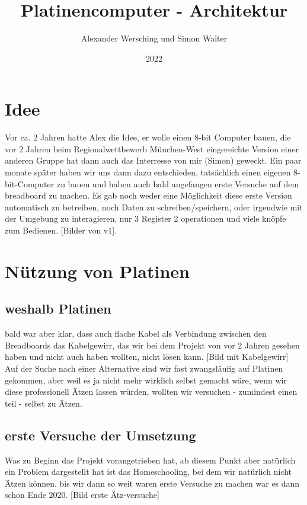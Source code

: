 \documentclass{scrartcl}
\begin{document}
    \title{Platinencomputer - Architektur}
    \author{Alexander Wersching und Simon Walter}
    \date{2022}
    \maketitle

    \newpage
    \tableofcontents
    \newpage

    \section{Idee}


    Vor ca. 2 Jahren hatte Alex die Idee, er wolle einen 8-bit Computer bauen, die vor 2 Jahren beim Regionalwettbewerb München-West eingereichte Version einer anderen Gruppe hat dann auch das Interresse von mir (Simon) geweckt.
    Ein paar monate später haben wir uns dann dazu entschieden, tatsächlich einen eigenen 8-bit-Computer zu bauen und haben auch bald angefangen erste Versuche auf dem breadboard zu machen.
    Es gab noch weder eine Möglichkeit diese erste Version automatisch zu betreiben, noch Daten zu schreiben/speichern, oder irgendwie mit der Umgebung zu interagieren, nur 3 Register 2 operationen und viele knöpfe zum Bedienen. [Bilder von v1].

    \section{Nützung von Platinen}
    \subsection{weshalb Platinen}
    bald war aber klar, dass auch flache Kabel als Verbindung zwischen den Breadboards das Kabelgewirr, das wir bei dem Projekt von vor 2 Jahren gesehen haben
    und nicht auch haben wollten, nicht lösen kann. [Bild mit Kabelgewirr]
    Auf der Suche nach einer Alternative sind wir fast zwangsläufig auf Platinen gekommen, aber weil es ja nicht mehr wirklich selbst gemacht wäre, wenn wir diese professionell Ätzen lassen würden,
    wollten wir versuchen - zumindest einen teil - selbst zu Ätzen.
    \subsection{erste Versuche der Umsetzung}
    Was zu Beginn das Projekt vorangetrieben hat, ab diesem Punkt aber natürlich ein Problem dargestellt hat ist das Homeschooling, bei dem wir natürlich nicht Ätzen können.
    bis wir dann so weit waren erste Versuche zu machen war es dann schon Ende 2020. [Bild erste Ätz-versuche]
\end{document}
